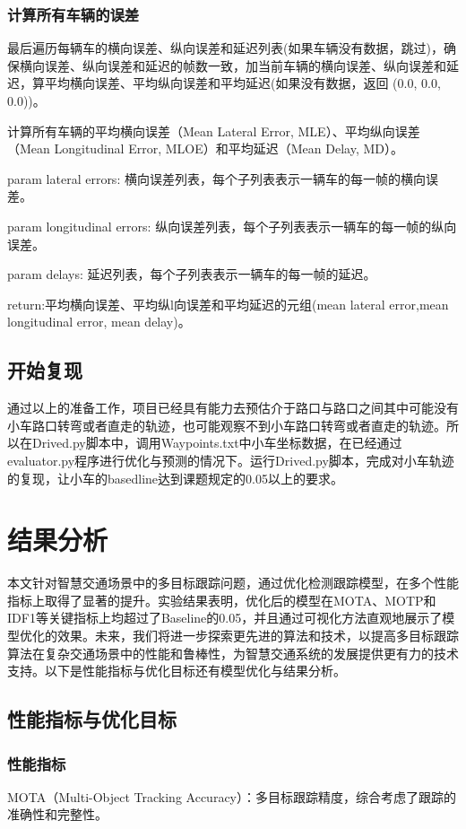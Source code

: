 \subsubsection{计算所有车辆的误差}
最后遍历每辆车的横向误差、纵向误差和延迟列表(如果车辆没有数据，跳过)，确保横向误差、纵向误差和延迟的帧数一致，加当前车辆的横向误差、纵向误差和延迟，算平均横向误差、平均纵向误差和平均延迟(如果没有数据，返回 (0.0, 0.0, 0.0))。

计算所有车辆的平均横向误差（Mean Lateral Error, MLE）、平均纵向误差（Mean Longitudinal Error, MLOE）和平均延迟（Mean Delay, MD）。

param lateral errors: 横向误差列表，每个子列表表示一辆车的每一帧的横向误差。

param longitudinal errors: 纵向误差列表，每个子列表表示一辆车的每一帧的纵向误差。

param delays: 延迟列表，每个子列表表示一辆车的每一帧的延迟。

return:平均横向误差、平均纵l向误差和平均延迟的元组(mean lateral error,mean longitudinal error, mean delay)。


\subsection{开始复现}
通过以上的准备工作，项目已经具有能力去预估介于路口与路口之间其中可能没有小车路口转弯或者直走的轨迹，也可能观察不到小车路口转弯或者直走的轨迹。所以在Drived.py脚本中，调用Waypoints.txt中小车坐标数据，在已经通过evaluator.py程序进行优化与预测的情况下。运行Drived.py脚本，完成对小车轨迹的复现，让小车的basedline达到课题规定的0.05以上的要求。


\section{结果分析}

本文针对智慧交通场景中的多目标跟踪问题，通过优化检测跟踪模型，在多个性能指标上取得了显著的提升。实验结果表明，优化后的模型在MOTA、MOTP和IDF1等关键指标上均超过了Baseline的0.05，并且通过可视化方法直观地展示了模型优化的效果。未来，我们将进一步探索更先进的算法和技术，以提高多目标跟踪算法在复杂交通场景中的性能和鲁棒性，为智慧交通系统的发展提供更有力的技术支持。以下是性能指标与优化目标还有模型优化与结果分析。

\subsection{性能指标与优化目标}
\subsubsection{性能指标}
MOTA（Multi-Object Tracking Accuracy）：多目标跟踪精度，综合考虑了跟踪的准确性和完整性。


